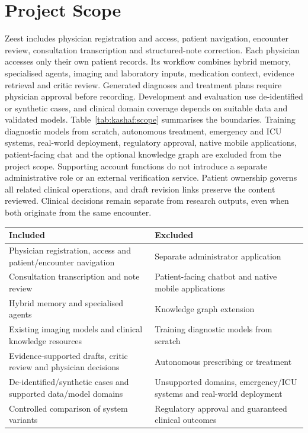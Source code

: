 
\section{Project Scope}

Zeest includes physician registration and access, patient navigation, encounter review, consultation transcription and structured-note correction. Each physician accesses only their own patient records. Its workflow combines hybrid memory, specialised agents, imaging and laboratory inputs, medication context, evidence retrieval and critic review. Generated diagnoses and treatment plans require physician approval before recording. Development and evaluation use de-identified or synthetic cases, and clinical domain coverage depends on suitable data and validated models. Table~\ref{tab:kashaf:scope} summarises the boundaries. Training diagnostic models from scratch, autonomous treatment, emergency and ICU systems, real-world deployment, regulatory approval, native mobile applications, patient-facing chat and the optional knowledge graph are excluded from the project scope. Supporting account functions do not introduce a separate administrative role or an external verification service. Patient ownership governs all related clinical operations, and draft revision links preserve the content reviewed. Clinical decisions remain separate from research outputs, even when both originate from the same encounter.

\begin{reporttable}
\centering
\small
\caption{Included capabilities and exclusions defining the boundaries of Zeest.}
\label{tab:kashaf:scope}
\begin{tabular}{|p{}|p{}|}
\hline
Included & Excluded \\ \hline
Physician registration, access and patient/encounter navigation & Separate administrator application \\ \hline
Consultation transcription and note review & Patient-facing chatbot and native mobile applications \\ \hline
Hybrid memory and specialised agents & Knowledge graph extension \\ \hline
Existing imaging models and clinical knowledge resources & Training diagnostic models from scratch \\ \hline
Evidence-supported drafts, critic review and physician decisions & Autonomous prescribing or treatment \\ \hline
De-identified/synthetic cases and supported data/model domains & Unsupported domains, emergency/ICU systems and real-world deployment \\ \hline
Controlled comparison of system variants & Regulatory approval and guaranteed clinical outcomes \\ \hline
\end{tabular}
\end{reporttable}

